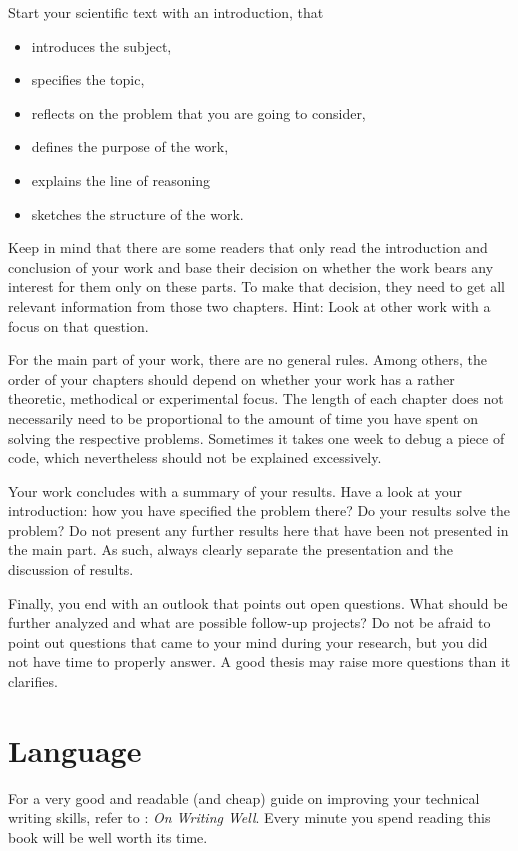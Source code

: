 Start your scientific text with an introduction, that
\begin{itemize}
    \item introduces the subject,
    \item specifies the topic,
    \item reflects on the problem that you are going to consider,
    \item defines the purpose of the work,
    \item explains the line of reasoning
    \item sketches the structure of the work.
\end{itemize}

Keep in mind that there are some readers that only read the introduction and conclusion of your work and base their decision on whether the work bears any interest for them only on these parts. 
To make that decision, they need to get all relevant information from those two chapters. 
Hint: Look at other work with a focus on that question.

For the main part of your work, there are no general rules. 
Among others, the order of your chapters should depend on whether your work has a rather theoretic, methodical or experimental focus. 
The length of each chapter does not necessarily need to be proportional to the amount of time you have spent on solving the respective problems. 
Sometimes it takes one week to debug a piece of code, which nevertheless should not be explained excessively.

Your work concludes with a summary of your results.
Have a look at your introduction: how you have specified the problem there? Do your results solve the problem?
Do not present any further results here that have been not presented in the main part. 
As such, always clearly separate the presentation and the discussion of results.

Finally, you end with an outlook that points out open questions. 
What should be further analyzed and what are possible follow-up projects?
Do not be afraid to point out questions that came to your mind during your research, but you did not have time to properly answer. 
A good thesis may raise more questions than it clarifies.


\section{Language}
For a very good and readable (and cheap) guide on improving your technical writing skills, refer to \textcite{Zinsser76}: \emph{On Writing Well}.
Every minute you spend reading this book will be well worth its time.

